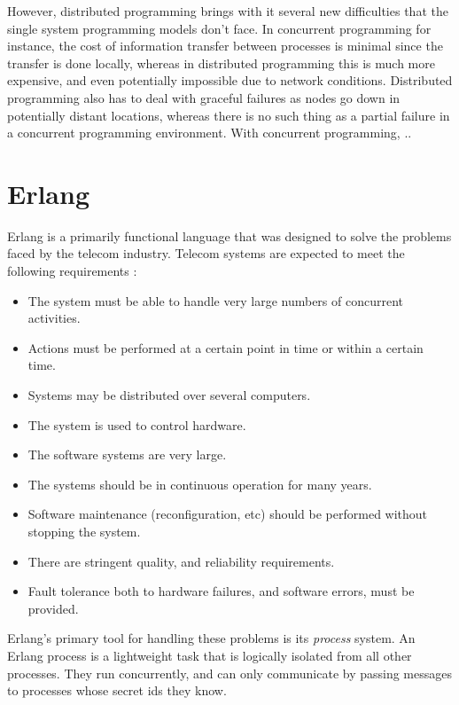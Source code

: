 \documentclass[10pt,a4paper,twocolumn]{article}
\begin{document}
However, distributed programming brings with it several new difficulties that
the single system programming models don't face. In concurrent programming for
instance, the cost of information transfer between processes is minimal since
the transfer is done locally, whereas in distributed programming this is much
more expensive, and even potentially impossible due to network conditions.
Distributed programming also has to deal with graceful failures as nodes go down
in potentially distant locations, whereas there is no such thing as a partial
failure in a concurrent programming environment. With concurrent programming, ..

\section{Erlang}

Erlang is a primarily functional language that was designed to solve the
problems faced by the telecom industry. Telecom systems are expected to meet the
following requirements \cite{dacker2000concurrent}:

\begin{itemize}
    \item The system must be able to handle very large numbers of concurrent activities.
    \item Actions must be performed at a certain point in time or within a certain time.
    \item Systems may be distributed over several computers.
    \item The system is used to control hardware.
    \item The software systems are very large.
    \item The systems should be in continuous operation for many years.
    \item Software maintenance (reconfiguration, etc) should be performed without stopping the system.
    \item There are stringent quality, and reliability requirements.
    \item Fault tolerance both to hardware failures, and software errors, must be provided.
\end{itemize}

Erlang's primary tool for handling these problems is its \emph{process} system.
\cite{erlangthesis} An Erlang process is a lightweight task that is logically
isolated from all other processes. They run concurrently, and can only
communicate by passing messages to processes whose secret ids they know.
\end{document}
